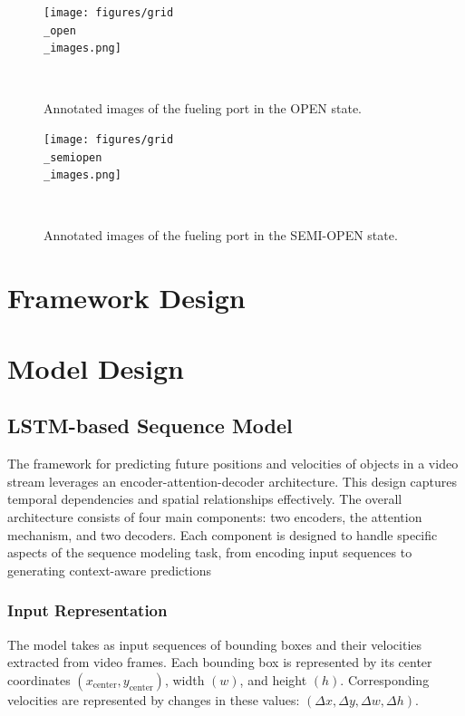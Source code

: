 \documentclass[12pt,oneside]{book} %
\begin{document}
\begin{figure}[H]
    \centering
    \texttt{[image: figures/grid\\\_open\\\_images.png]}
    \caption{Annotated images of the fueling port in the OPEN state.}~\label{fig:grid-open-images}
\end{figure}

\begin{figure}[H]
    \centering
    \texttt{[image: figures/grid\\\_semiopen\\\_images.png]}
    \caption{Annotated images of the fueling port in the SEMI-OPEN state.}~\label{fig:grid-semi-open-images}
\end{figure}

\section{Framework Design}

\section{Model Design}

\subsection{LSTM-based Sequence Model}
The framework for predicting future positions and velocities of objects in a
video stream leverages an encoder-attention-decoder architecture. This design
captures temporal dependencies and spatial relationships effectively. The
overall architecture consists of four main components: two encoders, the
attention mechanism, and two decoders. Each component is designed to handle
specific aspects of the sequence modeling task, from encoding input sequences
to generating context-aware predictions

\subsubsection{Input Representation}

The model takes as input sequences of bounding boxes and their velocities
extracted from video frames. Each bounding box is represented by its center
coordinates $(x_{\text{center}}, y_{\text{center}})$, width $(w)$, and height
$(h)$. Corresponding velocities are represented by changes in these values:
$(\Delta x, \Delta y, \Delta w, \Delta h)$. 
\end{document}
